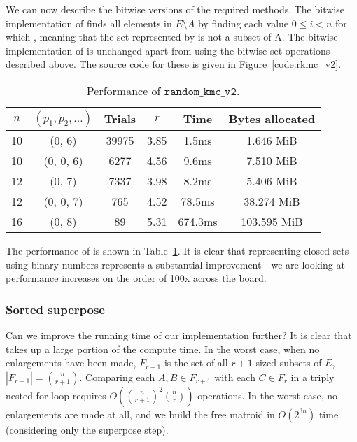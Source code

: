 We can now describe the bitwise versions of the required methods. The bitwise implementation of  finds all elements in $E \setminus A$ by finding each value $0\leq i< n$ for which , meaning that the set represented by  is not a subset of A. The bitwise implementation of  is unchanged apart from using the bitwise set operations described above. The source code for these is given in Figure~\ref{code:rkmc_v2}.

\begin{table}
  \centering
  \begin{tabular}{cccccc}
    \toprule
    $n$ & $(p_1, p_2, \ldots)$ & Trials & $r$ & Time  & Bytes allocated \\
    \midrule
    10 & (0, 6)     & 39975 & 3.85 & 1.5ms    & 1.646 MiB     \\
    10 & (0, 0, 6)  & 6277  & 4.56 & 9.6ms    & 7.510 MiB     \\
    12 & (0, 7)     & 7337  & 3.98 & 8.2ms    & 5.406 MiB     \\
    12 & (0, 0, 7)  & 765   & 4.52 & 78.5ms   & 38.274 MiB    \\
    16 & (0, 8)     & 89    & 5.31 & 674.3ms  & 103.595 MiB   \\
    \bottomrule
  \end{tabular}
  \caption{Performance of $\texttt{random\_kmc\_v2}$.}
  \label{tab:perf_v2}
\end{table}

The performance of  is shown in Table~\ref{tab:perf_v2}. It is clear that representing closed sets using binary numbers represents a substantial improvement---we are looking at performance increases on the order of 100x across the board.


\subsubsection{Sorted superpose}
Can we improve the running time of our implementation further? It is clear that  takes up a large portion of the compute time. In the worst case, when no enlargements have been made, $F_{r+1}$ is the set of all $r+1$-sized subsets of $E$, $|F_{r+1}| = {\binom{n}{r+1}}$. Comparing each $A,B \in F_{r+1}$ with each $C \in F_r$ in a triply nested for loop requires $O({\binom{n}{r+1}}^2{\binom{n}{r}})$ operations. In the worst case, no enlargements are made at all, and we build the free matroid in $O(2^{3n})$ time (considering only the superpose step).

